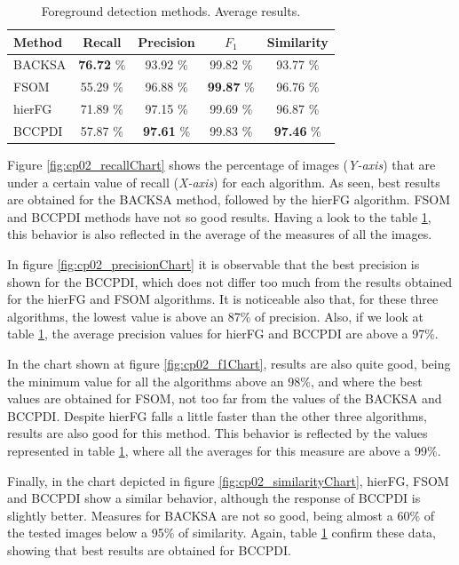 \begin{table}[t]
\begin{center}
\resizebox{0.5\columnwidth}{!} {
\begin{tabular}{|l|c|c|c|c|}
\hline
Method & Recall & Precision & $F_1$ & Similarity \\
\hline
BACKSA & \textbf{76.72} \% & 93.92 \% & 99.82 \% & 93.77 \% \\
FSOM & 55.29 \% & 96.88 \% & \textbf{99.87} \% & 96.76 \% \\
hierFG & 71.89 \% & 97.15 \% & 99.69 \% & 96.87 \% \\
BCCPDI & 57.87 \% & \textbf{97.61} \% & 99.83 \% & \textbf{97.46} \% \\
\hline
\end{tabular}
}
\caption{Foreground detection methods. Average results.}\label{table:fgAverage}
\end{center}
\end{table}

Figure \ref{fig:cp02_recallChart} shows the percentage of images (\emph{Y-axis}) that are under a certain value of recall (\emph{X-axis}) 
for each algorithm. As seen, best results are obtained for the BACKSA method, followed by the hierFG algorithm.  FSOM 
and BCCPDI methods have not so good results. Having a look to the table \ref{table:fgAverage}, this behavior is also 
reflected in the average of the measures of all the images.

In figure \ref{fig:cp02_precisionChart} it is observable that the best precision is shown for the BCCPDI, which does not 
differ too much from the results obtained for the hierFG and FSOM algorithms. It is noticeable also that, for these 
three algorithms, the lowest value is above an 87\% of precision. Also, if we look at table \ref{table:fgAverage}, 
the average precision values for hierFG and BCCPDI are above a 97\%.

In the chart shown at figure \ref{fig:cp02_f1Chart}, results are also quite good, being the minimum value for all the 
algorithms above an 98\%, and where the best values are obtained for FSOM, not too far from the values of the BACKSA and 
BCCPDI. Despite hierFG falls a little faster than the other three algorithms, results are also good for this 
method. This behavior is reflected by the values represented in table \ref{table:fgAverage}, where all the averages 
for this measure are above a 99\%.

Finally, in the chart depicted in figure \ref{fig:cp02_similarityChart}, hierFG, FSOM and BCCPDI show a similar behavior, 
although the response of BCCPDI is slightly better. Measures for BACKSA are not so good, being almost a 60\% of the 
tested images below a 95\% of similarity. Again, table \ref{table:fgAverage} confirm these data, showing that best 
results are obtained for BCCPDI.


